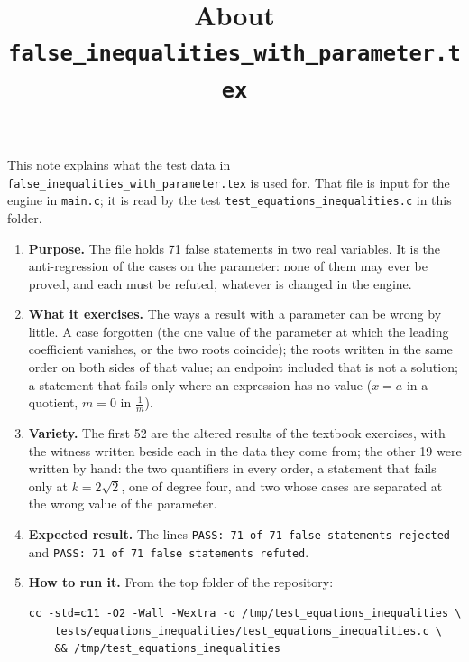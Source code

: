 \documentclass[11pt,a4paper]{article}
\title{About \texttt{false\_inequalities\_with\_parameter.tex}}
\author{}
\date{}
\begin{document}
\maketitle
This note explains what the test data in \texttt{false\_inequalities\_with\_parameter.tex} is used for. That file is input for the engine in \texttt{main.c}; it is read by the test \texttt{test\_equations\_inequalities.c} in this folder.

\begin{enumerate}
\item \textbf{Purpose.} The file holds 71 false statements in two real variables. It is the anti-regression of the cases on the parameter: none of them may ever be proved, and each must be refuted, whatever is changed in the engine.

\item \textbf{What it exercises.} The ways a result with a parameter can be wrong by little. A case forgotten (the one value of the parameter at which the leading coefficient vanishes, or the two roots coincide); the roots written in the same order on both sides of that value; an endpoint included that is not a solution; a statement that fails only where an expression has no value ($x = a$ in a quotient, $m = 0$ in $\frac{1}{m}$).

\item \textbf{Variety.} The first 52 are the altered results of the textbook exercises, with the witness written beside each in the data they come from; the other 19 were written by hand: the two quantifiers in every order, a statement that fails only at $k = 2\sqrt{2}$, one of degree four, and two whose cases are separated at the wrong value of the parameter.

\item \textbf{Expected result.} The lines \texttt{PASS: 71 of 71 false statements rejected} and \texttt{PASS: 71 of 71 false statements refuted}.

\item \textbf{How to run it.} From the top folder of the repository:
\begin{verbatim}
cc -std=c11 -O2 -Wall -Wextra -o /tmp/test_equations_inequalities \
    tests/equations_inequalities/test_equations_inequalities.c \
    && /tmp/test_equations_inequalities
\end{verbatim}
\end{enumerate}
\end{document}
